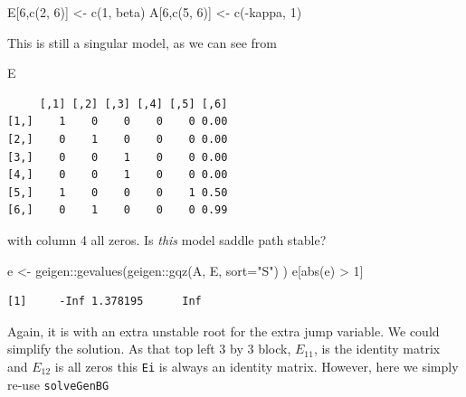 \documentclass[
  letterpaper,
]{book}
\newenvironment{Shaded}{\begin{snugshade}}{\end{snugshade}}
\newcommand{\AttributeTok}[1]{\textcolor[rgb]{0.40,0.45,0.13}{#1}}
\newcommand{\DecValTok}[1]{\textcolor[rgb]{0.68,0.00,0.00}{#1}}
\newcommand{\FunctionTok}[1]{\textcolor[rgb]{0.28,0.35,0.67}{#1}}
\newcommand{\NormalTok}[1]{\textcolor[rgb]{0.00,0.23,0.31}{#1}}
\newcommand{\OtherTok}[1]{\textcolor[rgb]{0.00,0.23,0.31}{#1}}
\newcommand{\SpecialCharTok}[1]{\textcolor[rgb]{0.37,0.37,0.37}{#1}}
\newcommand{\StringTok}[1]{\textcolor[rgb]{0.13,0.47,0.30}{#1}}
\begin{document}
\begin{Shaded}
\begin{Highlighting}[]
\NormalTok{E[}\DecValTok{6}\NormalTok{,}\FunctionTok{c}\NormalTok{(}\DecValTok{2}\NormalTok{, }\DecValTok{6}\NormalTok{)]     }\OtherTok{\textless{}{-}} \FunctionTok{c}\NormalTok{(}\DecValTok{1}\NormalTok{, beta)}
\NormalTok{A[}\DecValTok{6}\NormalTok{,}\FunctionTok{c}\NormalTok{(}\DecValTok{5}\NormalTok{, }\DecValTok{6}\NormalTok{)]     }\OtherTok{\textless{}{-}} \FunctionTok{c}\NormalTok{(}\SpecialCharTok{{-}}\NormalTok{kappa, }\DecValTok{1}\NormalTok{)}
\end{Highlighting}
\end{Shaded}

This is still a singular model, as we can see from

\begin{Shaded}
\begin{Highlighting}[]
\NormalTok{E}
\end{Highlighting}
\end{Shaded}

\begin{verbatim}
     [,1] [,2] [,3] [,4] [,5] [,6]
[1,]    1    0    0    0    0 0.00
[2,]    0    1    0    0    0 0.00
[3,]    0    0    1    0    0 0.00
[4,]    0    0    1    0    0 0.00
[5,]    1    0    0    0    1 0.50
[6,]    0    1    0    0    0 0.99
\end{verbatim}

with column 4 all zeros. Is \emph{this} model saddle path stable?

\begin{Shaded}
\begin{Highlighting}[]
\NormalTok{e }\OtherTok{\textless{}{-}}\NormalTok{ geigen}\SpecialCharTok{::}\FunctionTok{gevalues}\NormalTok{(geigen}\SpecialCharTok{::}\FunctionTok{gqz}\NormalTok{(A, E, }\AttributeTok{sort=}\StringTok{"S"}\NormalTok{) )}
\NormalTok{e[}\FunctionTok{abs}\NormalTok{(e) }\SpecialCharTok{\textgreater{}} \DecValTok{1}\NormalTok{]}
\end{Highlighting}
\end{Shaded}

\begin{verbatim}
[1]     -Inf 1.378195      Inf
\end{verbatim}

Again, it is with an extra unstable root for the extra jump variable. We
could simplify the solution. As that top left 3 by 3 block, \(E_{11}\),
is the identity matrix and \(E_{12}\) is all zeros this \texttt{Ei} is
always an identity matrix. However, here we simply re-use
\texttt{solveGenBG}
\end{document}
